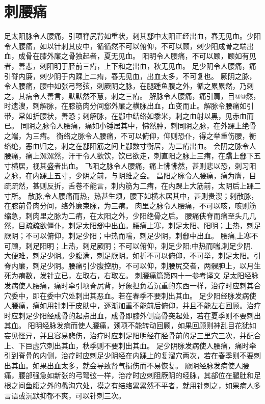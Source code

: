 \documentclass[a4paper,12pt,UTF8,twoside]{ctexbook}
\begin{document}
\chapter{刺腰痛}
足太阳脉令人腰痛，引项脊尻背如重状，刺其郄中太阳正经出血，春无见血。少阳令人腰痛，如以针刺其皮中，循循然不可以俯仰，不可以顾，刺少阳成骨之端出血，成骨在膝外廉之骨独起者，夏无见血。
阳明令人腰痛，不可以顾，顾如有见者，善悲，刺阳明于胫前三痏，上下和之出血，秋无见血。
足少阴令人腰痛，痛引脊内廉，刺少阴于内踝上二痏，春无见血，出血太多，不可复也。
厥阴之脉，令人腰痛，腰中如张弓弩弦，刺厥阴之脉，在腿踵鱼腹之外，循之累累然，乃刺之，其病令人善言，默默然不慧，刺之三痏。
解脉令人腰痛，痛引肩，目@@然，时遗溲，刺解脉，在膝筋肉分间郄外廉之横脉出血，血变而止。解脉令腰痛如引带，常如折腰状，善恐；刺解脉，在郄中结络如黍米，刺之血射以黑，见赤血而已。
同阴之脉令人腰痛，痛如小锤居其中，怫然肿，刺同阴之脉，在外踝上绝骨之端，为三痏。
衡络之脉令人腰痛，不可以俯仰，仰则恐仆，得之举重伤腰，衡络绝，恶血归之，刺之在郄阳筋之间上郄数寸衡居，为二痏出血。
会阴之脉令人腰痛，痛上漯漯然，汗干令人欲饮，饮已欲走，刺直阳之脉上三痏，在蹻上郄下五寸横居，视其盛者出血。
飞阳之脉令人腰痛，痛上怫怫然，甚则悲以恐，刺习阳之脉，在内踝上五寸，少阴之前，与阴维之会。
昌阳之脉令人腰痛，痛为膺，目疏疏然，甚则反折，舌卷不能言，刺内筋为二痏，在内踝上大筋前，太阴后上踝二寸所。
散脉,令人腰痛而热，热甚生烦，腰下如横木居其中，甚则贵溲；刺散脉，在膝前骨肉分间，络外廉束脉，为三痏。
肉里之脉令人腰痛，不可以咳，咳则筋缩急，刺肉里之脉为二痏，在太阳之外，少阳绝骨之后。
腰痛侠脊而痛至头几几然，目疏疏欲僵仆，刺足太阳郄中出血。腰痛上寒，刺足太阳、阳明；上热，刺足厥阴；不可以俯仰，刺足少阳；中热而喘，刺足少阴，刺郄中出血。
腰痛,上寒不可顾，刺足阳明；上热，刺足厥阴；不可以俯仰，刺足少阳;中热而喘,刺足少阴.
大便难，刺足少阴。少腹满，刺足厥阴。如折不可以俯仰，不可举，刺足太阳。引脊内廉，刺足少阴。腰痛引少腹控肋，不可以仰，刺腰尻交者，两髁胂上，以月生死为痏数，发针立已，左取右，右取左。
刺腰痛篇第四十一参考译文
足太阳经脉发病使人腰痛，痛时牵引项脊尻背，好象担负着沉重的东西一样，治疗时应刺其合穴委中，即在委中穴处刺出其恶血。若在春季不要刺出其血。
足少阳经脉发病使人腰痛，痛如用针刺于皮肤中，逐渐加重不能前后俯仰，并且不能左右回顾。治疗时应刺足少阳经成骨的起点出血，成骨即膝外侧高骨突起处，若在夏季则不要刺出其血。
阳明经脉发病而使人腰痛，颈项不能转动回顾，如果回顾则神乱目花犹如妄见怪异，并且容易悲伤，治疗时应刺足阳明经在胫骨前的足三里穴三次，并配合上、下巨虚穴刺出其血，秋季则不要刺出其血。
足少阴脉发病使人腰痛，痛时牵引到脊骨的内侧，治疗时应刺足少阴经在内踝上的复溜穴两次，若在春季则不要刺出其血。如果出血太多，就会导致肾气损伤而不易恢复。
厥阴经脉发病使人腰痛，腰部强急如新张的弓弩弦一样，治疗时应刺阻厥阴的经脉，其部位在腿肚和足根之间鱼腹之外的蠡沟穴处，摸之有结络累累然不平者，就用针刺之，如果病人多言语或沉默抑郁不爽，可以针刺三次。
\end{document}
